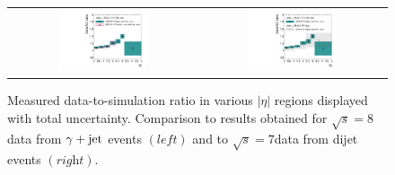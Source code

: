 \begin{figure}[!t]
  \centering
  \begin{tabular}{cc}
                \includegraphics[width=0.49\textwidth]{figures/JER_2012_compPhoton_final_combination_v1.pdf} &
                \includegraphics[width=0.49\textwidth]{figures/JER_2012_comp2011_final_combination_v1.pdf}
  \end{tabular}
  \caption{Measured data-to-simulation ratio in various $|\eta|$ regions displayed with total uncertainty. Comparison to results obtained for $\sqrt{s}=8$\tev data from $\gamma +\rm{jet}$ events $(\textit{left})$ and to $\sqrt{s}=7$\tev data from dijet events $(\textit{right})$.}
  \label{fig:result_comparison}
\end{figure}

